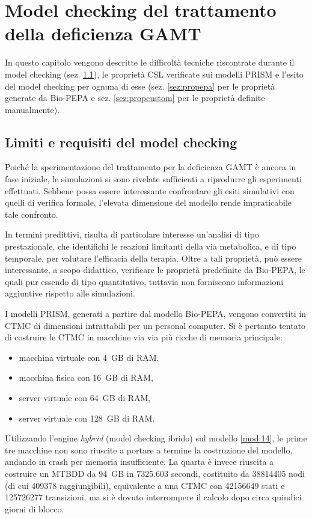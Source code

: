 \chapter{Model checking del trattamento della deficienza GAMT}\label{cap:modelchecking}
In questo capitolo vengono descritte le difficolt\`a tecniche riscontrate durante il model checking (sez. \ref{sez:limiti}), le propriet\`a CSL verificate sui modelli PRISM e l'esito del model checking per ognuna di esse (sez. \ref{sez:propepa} per le propriet\`a generate da Bio-PEPA e sez. \ref{sez:propcustom} per le propriet\`a definite manualmente).

\section{Limiti e requisiti del model checking}\label{sez:limiti}
Poich\'e la sperimentazione del trattamento per la deficienza GAMT \`e ancora in fase iniziale, le simulazioni si sono rivelate sufficienti a riprodurre gli esperimenti effettuati.
Sebbene possa essere interessante confrontare gli esiti simulativi con quelli di verifica formale, l'elevata dimensione del modello rende impraticabile tale confronto.

In termini predittivi, risulta di particolare interesse un'analisi di tipo prestazionale, che identifichi le reazioni limitanti della via metabolica, e di tipo temporale, per valutare l'efficacia della terapia.
Oltre a tali propriet\`a, pu\`o essere interessante, a scopo didattico, verificare le propriet\`a predefinite da Bio-PEPA, le quali pur essendo di tipo quantitativo, tuttavia non forniscono informazioni aggiuntive rispetto alle simulazioni.

I modelli PRISM, generati a partire dal modello Bio-PEPA, vengono convertiti in CTMC di dimensioni intrattabili per un personal computer.
Si \`e pertanto tentato di costruire le CTMC in macchine via via pi\`u ricche di memoria principale:
\begin{itemize}
	\item macchina virtuale con \SI{4}{GB} di RAM,
	\item macchina fisica con \SI{16}{GB} di RAM,
	\item server virtuale con \SI{64}{GB} di RAM,
	\item server virtuale con \SI{128}{GB} di RAM.
\end{itemize}
Utilizzando l'engine \emph{hybrid} (model checking ibrido) sul modello \ref{mod:14}, le prime tre macchine non sono riuscite a portare a termine la costruzione del modello, andando in crash per memoria insufficiente.
La quarta \`e invece riuscita a costruire un MTBDD da \SI{94}{GB} in 7325.603 secondi, costituito da 38814405 nodi (di cui 409378 raggiungibili), equivalente a una CTMC con 42156649 stati e 125726277 transizioni, ma si \`e dovuto interrompere il calcolo dopo circa quindici giorni di blocco.

